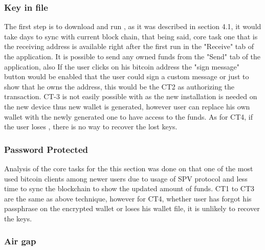 
\subsubsection{Key in file}
The first step is to download and run \bitcoinclient, as it was described in section 4.1, it would take days to sync with current block chain, that being said, core task one that is the receiving address is available right after the first run in the "Receive" tab of the application. It is possible to send any owned funds from the "Send" tab of the application, also If the user clicks on his bitcoin address the "sign message" button would be enabled that the user could sign a custom message or just to show that he owns the address, this would be the CT2 as authorizing the transaction. CT-3 is not easily possible with \bitcoinclient as the new installation is needed on the new device thus new wallet is generated, however user can replace his own wallet with the newly generated one to have access to the funds. As for CT4, if the user loses \walletfile, there is no way to recover the lost keys.


\subsubsection{Password Protected}
Analysis of the core tasks for the this section was done on \multibit that one of the most used bitcoin clients among newer users due to usage of SPV protocol and less time to sync the blockchain to show the updated amount of funds. CT1 to CT3 are the same as above technique, however for CT4, whether user has forgot his passphrase on the encrypted wallet or loses his wallet file, it is unlikely to recover the keys.


\subsubsection{Air gap}
\label{sec:air gap}


